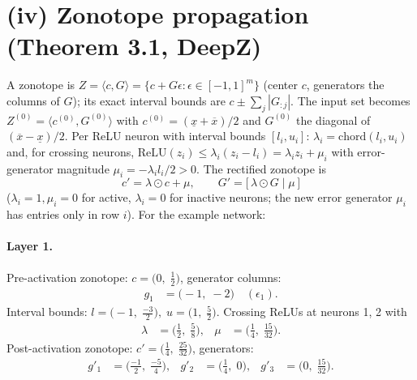 \documentclass[11pt]{article}
\begin{document}
\section{(iv) Zonotope propagation (Theorem 3.1, DeepZ)}
A zonotope is $Z = \langle c, G \rangle = \{c + G\epsilon : \epsilon \in [-1,1]^m\}$
(center $c$, generators the columns of $G$); its exact interval bounds are
$c \pm \sum_j |G_{:j}|$. The input set becomes $Z^{(0)} = \langle c^{(0)}, G^{(0)} \rangle$ with
$c^{(0)} = (\underline{x} + \overline{x})/2$ and $G^{(0)}$ the diagonal of $(\overline{x} - \underline{x})/2$.
Per ReLU neuron with interval bounds $[l_i, u_i]$:
$\lambda_i = \mathrm{chord}(l_i, u_i)$ and, for crossing neurons,
$\mathrm{ReLU}(z_i) \le \lambda_i (z_i - l_i) = \lambda_i z_i + \mu_i$ with error-generator magnitude
$\mu_i = -\lambda_i l_i / 2 > 0$. The rectified zonotope is
\begin{equation*}
c' = \lambda \odot c + \mu, \qquad G' = \bigl[\, \lambda \odot G \;\big|\; \mu\, \bigr]
\end{equation*}
($\lambda_i = 1, \mu_i = 0$ for active, $\lambda_i = 0$ for inactive neurons;
the new error generator $\mu_i$ has entries only in row $i$).
For the example network:
\paragraph{Layer 1.}
Pre-activation zonotope: $c = \bigl(0,\; \frac{1}{2}\bigr)$, generator columns:
\begin{align*}
g_{1} &= \bigl(-1,\; -2\bigr) \quad (\epsilon_{1}).
\end{align*}
Interval bounds: $l = \bigl(-1,\; \frac{-3}{2}\bigr), \; u = \bigl(1,\; \frac{5}{2}\bigr)$. 
Crossing ReLUs at neurons 1, 2 with
\begin{align*}
\lambda &= \bigl(\frac{1}{2},\; \frac{5}{8}\bigr), & \mu &= \bigl(\frac{1}{4},\; \frac{15}{32}\bigr).
\end{align*}
Post-activation zonotope: $c' = \bigl(\frac{1}{4},\; \frac{25}{32}\bigr)$, generators:
\begin{align*}
g'_{1} &= \bigl(\frac{-1}{2},\; \frac{-5}{4}\bigr), &
g'_{2} &= \bigl(\frac{1}{4},\; 0\bigr), &
g'_{3} &= \bigl(0,\; \frac{15}{32}\bigr).
\end{align*}
\end{document}
